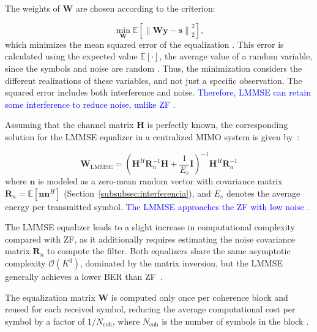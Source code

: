 The weights of $\mathbf W$ are chosen according to the criterion:

\begin{equation}
\min_{\mathbf{W}}
\mathbb{E}
\left[
\left\|\mathbf{W}\mathbf{y}-\mathbf{s}\right\|_2^2
\right],
\label{eq:lmmse_opt}
\end{equation}
which minimizes the mean squared error of the equalization \cite{zhao2025jsac}. This error is calculated using the expected value $\mathbb E[\cdot]$, the average value of a random variable, since the symbols and noise are random \cite{haykin}. Thus, the minimization considers the different realizations of these variables, and not just a specific observation.
The squared error includes both interference and noise. \textcolor{blue}{Therefore, LMMSE can retain some interference to reduce noise, unlike ZF \cite{tse-viswanath}.}

Assuming that the channel matrix $\mathbf{H}$ is perfectly known, the
corresponding solution for the LMMSE equalizer in a centralized MIMO system
is given by~\cite{zhao2025jsac}:

\begin{equation}
\mathbf{W}_\text{LMMSE}=
\left(
\mathbf{H}^H\mathbf{R}_n^{-1}\mathbf{H}
+
\frac{1}{E_s}\mathbf{I}
\right)^{-1}
\mathbf{H}^H\mathbf{R}_n^{-1}
\label{eq:lmmse_solution}
\end{equation}
where $\mathbf{n}$ is modeled as a zero-mean random vector with covariance
matrix $\mathbf{R}_n = \mathbb{E}[\mathbf{n}\mathbf{n}^H]$ (Section~\ref{subsubsec:interferencia}), and $E_s$
denotes the average energy per transmitted symbol. \textcolor{blue}{The LMMSE approaches the ZF with low noise \cite{tse-viswanath}.}

The LMMSE equalizer leads to a slight increase in computational complexity
compared with ZF, as it additionally requires estimating the noise covariance matrix $\mathbf{R}_n$ to compute the filter. Both equalizers share the same asymptotic complexity
$\mathcal{O}(K^3)$, dominated by the matrix inversion, but the LMMSE
generally achieves a lower BER than ZF~\cite{li-tradeofs}.

The equalization
matrix $\mathbf{W}$ is computed only once per coherence block and reused for
each received symbol, reducing the average computational cost per symbol by a
factor of $1/N_\text{coh}$, where $N_\text{coh}$ is the number of symbols in the block \cite{zhao2025jsac}.
